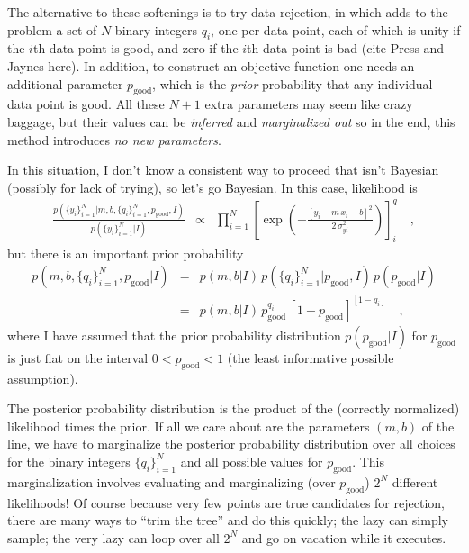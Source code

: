 \documentclass[12pt]{article}
\newcounter{problem}
\newcommand{\setofall}[3]{\{{#1}\}_{{#2}}^{{#3}}}
\newcommand{\allq}{\setofall{q_i}{i=1}{N}}
\newcommand{\ally}{\setofall{y_i}{i=1}{N}}
\newcommand{\pgood}{p_{\mathrm{good}}}
\begin{document}
The alternative to these softenings is to try data rejection, in which
adds to the problem a set of $N$ binary integers $q_i$, one per data
point, each of which is unity if the $i$th data point is good, and
zero if the $i$th data point is bad (cite Press and Jaynes here).  In
addition, to construct an objective function one needs an additional
parameter $\pgood$, which is the \emph{prior} probability that any
individual data point is good.  All these $N+1$ extra parameters may
seem like crazy baggage, but their values can be \emph{inferred} and
\emph{marginalized out} so in the end, this method introduces \emph{no
  new parameters}.

In this situation, I don't know a consistent way to proceed that isn't
Bayesian (possibly for lack of trying), so let's go Bayesian.  In this
case, likelihood is
\begin{eqnarray}\displaystyle
\frac{p(\ally|m,b,\allq,\pgood,I)}{p(\ally|I)}
 &\propto& \prod_{i=1}^N \left[\exp\left(-\frac{[y_i-m\,x_i-b]^2}{2\,\sigma_{yi}^2}\right)\right]^q_i \quad ,
\end{eqnarray}
but there is an important prior probability
\begin{eqnarray}\displaystyle
p(m,b,\allq,\pgood|I)
 &=& p(m,b|I)\,p(\allq|\pgood,I)\,p(\pgood|I) \nonumber \\
 &=& p(m,b|I)\,\pgood^{q_i}\,[1-\pgood]^{[1-q_i]} \quad ,
\end{eqnarray}
where I have assumed that the prior probability distribution
$p(\pgood|I)$ for $\pgood$ is just flat on the interval $0<\pgood<1$
(the least informative possible assumption).

The posterior probability distribution is the product of the
(correctly normalized) likelihood times the prior.  If all we care
about are the parameters $(m,b)$ of the line, we have to marginalize
the posterior probability distribution over all choices for the binary
integers $\allq$ and all possible values for $\pgood$.  This
marginalization involves evaluating and marginalizing (over $\pgood$)
$2^N$ different likelihoods!  Of course because very few points are
true candidates for rejection, there are many ways to ``trim the
tree'' and do this quickly; the lazy can simply sample; the very lazy
can loop over all $2^N$ and go on vacation while it executes.
\end{document}
